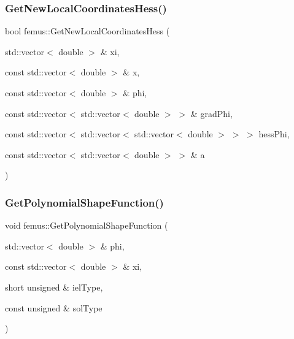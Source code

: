 \subsubsection{\texorpdfstring{Get\+New\+Local\+Coordinates\+Hess()}{GetNewLocalCoordinatesHess()}}
{\footnotesize\ttfamily bool femus\+::\+Get\+New\+Local\+Coordinates\+Hess (\begin{DoxyParamCaption}\item[{std\+::vector$<$ double $>$ \&}]{xi,  }\item[{const std\+::vector$<$ double $>$ \&}]{x,  }\item[{const std\+::vector$<$ double $>$ \&}]{phi,  }\item[{const std\+::vector$<$ std\+::vector$<$ double $>$ $>$ \&}]{grad\+Phi,  }\item[{const std\+::vector$<$ std\+::vector$<$ std\+::vector$<$ double $>$ $>$ $>$}]{hess\+Phi,  }\item[{const std\+::vector$<$ std\+::vector$<$ double $>$ $>$ \&}]{a }\end{DoxyParamCaption})}

\mbox{\label{namespacefemus_a0b417b15e6a459ced1afc29b5f28250e}} 
\subsubsection{\texorpdfstring{Get\+Polynomial\+Shape\+Function()}{GetPolynomialShapeFunction()}}
{\footnotesize\ttfamily void femus\+::\+Get\+Polynomial\+Shape\+Function (\begin{DoxyParamCaption}\item[{std\+::vector$<$ double $>$ \&}]{phi,  }\item[{const std\+::vector$<$ double $>$ \&}]{xi,  }\item[{short unsigned \&}]{iel\+Type,  }\item[{const unsigned \&}]{sol\+Type }\end{DoxyParamCaption})}

\mbox{\label{namespacefemus_aaa94526c56505b615727fd8d6cda22e2}} 
